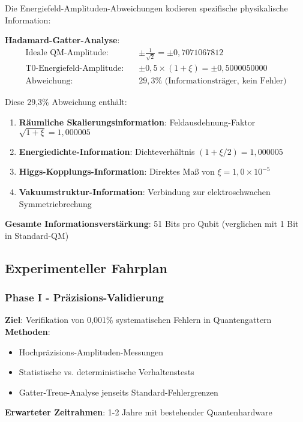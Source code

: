 \documentclass[12pt,a4paper]{article}
\begin{document}
	Die Energiefeld-Amplituden-Abweichungen kodieren spezifische physikalische Information:
	
	\textbf{Hadamard-Gatter-Analyse}:
	\begin{align}
		\text{Ideale QM-Amplitude:} \quad &\pm \frac{1}{\sqrt{2}} = \pm 0,7071067812 \\
		\text{T0-Energiefeld-Amplitude:} \quad &\pm 0,5 \times (1 + \xi) = \pm 0,5000050000 \\
		\text{Abweichung:} \quad &29,3\% \text{ (Informationsträger, kein Fehler)}
	\end{align}
	
	Diese 29,3\% Abweichung enthält:
	\begin{enumerate}
		\item \textbf{Räumliche Skalierungsinformation}: Feldausdehnung-Faktor $\sqrt{1+\xi} = 1,000005$
		\item \textbf{Energiedichte-Information}: Dichteverhältnis $(1+\xi/2) = 1,000005$
		\item \textbf{Higgs-Kopplungs-Information}: Direktes Maß von $\xi = 1,0 \times 10^{-5}$
		\item \textbf{Vakuumstruktur-Information}: Verbindung zur elektroschwachen Symmetriebrechung
	\end{enumerate}
	
	\textbf{Gesamte Informationsverstärkung}: 51 Bits pro Qubit (verglichen mit 1 Bit in Standard-QM)
	
	\subsection{Experimenteller Fahrplan}
	
	\subsubsection{Phase I - Präzisions-Validierung}
	
	\textbf{Ziel}: Verifikation von 0,001\% systematischen Fehlern in Quantengattern
	\textbf{Methoden}: 
	\begin{itemize}
		\item Hochpräzisions-Amplituden-Messungen
		\item Statistische vs. deterministische Verhaltenstests
		\item Gatter-Treue-Analyse jenseits Standard-Fehlergrenzen
	\end{itemize}
	\textbf{Erwarteter Zeitrahmen}: 1-2 Jahre mit bestehender Quantenhardware
	
\end{document}
